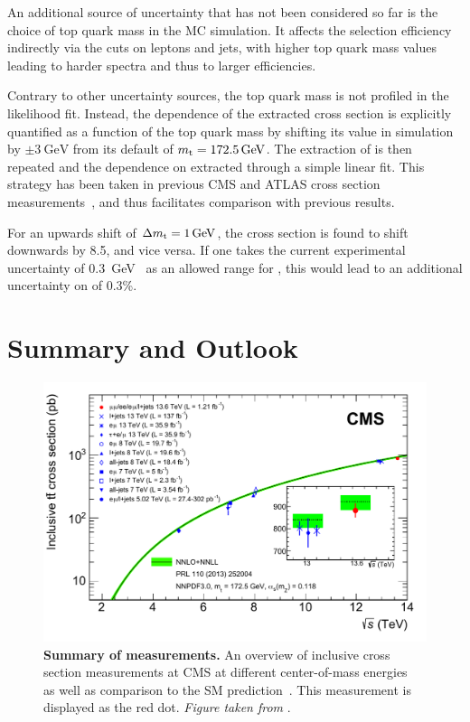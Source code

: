 An additional source of uncertainty that has not been considered so far is the choice of top quark mass in the \ttbar MC simulation. It affects the selection efficiency indirectly via the \pt cuts on leptons and jets, with higher top quark mass values leading to harder spectra and thus to larger efficiencies.

Contrary to other uncertainty sources, the top quark mass is not profiled in the likelihood fit. Instead, the dependence of the extracted \ttbar cross section is explicitly quantified as a function of the top quark mass by shifting its value in simulation by $\pm \SI{3}{\GeV}$ from its default of $\mt = \SI{172.5}{\GeV}$.
The extraction of \sigmatt is then repeated and the dependence on \mt extracted through a simple linear fit. This strategy has been taken in previous CMS and ATLAS \ttbar cross section measurements~\cite{CMS:TOP-17-001,ATLAS:2020aln}, and thus facilitates comparison with previous results.

For an upwards shift of $\Delta \mt = \SI{1}{\GeV}$, the \ttbar cross section is found to shift downwards by \SI{8.5}{\pb}, and vice versa. If one takes the current experimental uncertainty of \SI{0.3}{\GeV}~\cite{PDG:2022pth} as an allowed range for \mt, this would lead to an additional uncertainty on \sigmatt of 0.3\%.

\section{Summary and Outlook}
\label{sec:ttxs:summary}

\begin{figure}[!ht]
    \centering
    \includegraphics[width=0.8\linewidth]{figures/ttxs/tt_curve.pdf}
    \caption{\textbf{Summary of \sigmatt measurements.} An overview of inclusive \ttbar cross section measurements at CMS at different center-of-mass energies~\cite{CMS:TOP-11-007, CMS:TOP-14-018, CMS:TOP-12-006, CMS:TOP-13-004, CMS:TOP-17-001, CMS:TOP-18-005, CMS:TOP-20-001, CMS:TOP-20-004} as well as comparison to the SM prediction~\cite{Czakon:2013goa}. This measurement is displayed as the red dot. \textit{Figure taken from }.}
    \label{fig:ttxs:ttcurve}
\end{figure}

